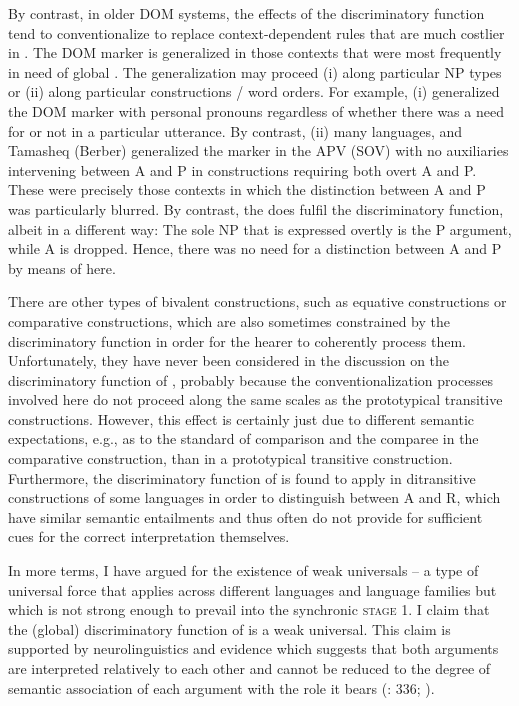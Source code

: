\documentclass[output=paper]{langsci/langscibook}
\begin{document}
By contrast, in older DOM systems, the effects of the discriminatory function tend to conventionalize to replace context-dependent rules that are much costlier in . The DOM marker is generalized in those contexts that were most frequently in need of global . The generalization may proceed (i) along particular NP types or (ii) along particular constructions / word orders. For example, (i)  generalized the DOM marker with personal pronouns regardless of whether there was a need for  or not in a particular utterance. By contrast, (ii) many  languages,  and Tamasheq (Berber) generalized the marker in the APV (SOV)  with no auxiliaries intervening between A and P in constructions requiring both overt A and P. These were precisely those contexts in which the distinction between A and P was particularly blurred. By contrast, the  does fulfil the discriminatory function, albeit in a different way: The sole NP that is expressed overtly is the P argument, while A is dropped. Hence, there was no need for a distinction between A and P by means of  here.

There are other types of bivalent constructions, such as equative constructions or comparative constructions, which are also sometimes constrained by the discriminatory function in order for the hearer to coherently process them. Unfortunately, they have never been considered in the  discussion on the discriminatory function of , probably because the conventionalization processes involved here do not proceed along the same scales as the prototypical transitive constructions. However, this effect is certainly just due to different semantic expectations, e.g., as to the standard of comparison and the comparee in the comparative construction, than in a prototypical transitive construction. Furthermore, the discriminatory function of  is found to apply in ditransitive constructions of some languages in order to distinguish between A and R, which have similar semantic entailments and thus often do not provide for sufficient cues for the correct interpretation themselves. 

In more  terms, I have argued for the existence of weak universals – a type of universal force that applies across different languages and language families but which is not strong enough to prevail into the synchronic \textsc{stage} 1. I claim that the (global) discriminatory function of  is a weak universal. This claim is supported by neurolinguistics and  evidence which suggests that both arguments are interpreted relatively to each other and cannot be reduced to the degree of semantic association of each argument with the role it bears (\citealt{Bornkessel-SchlesewskySchlesewsky2015}: 336; \citealt{AhnCho2007,FedzechkinaEtAl2012,KurumadaJaeger2015}).
\end{document}
